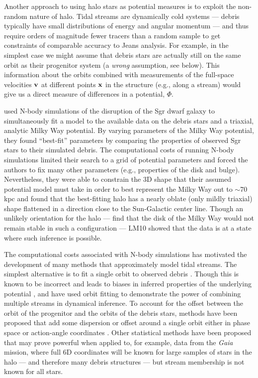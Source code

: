 \documentclass{emulateapj}
\newcommand{\project}[1]{\textsl{#1}}
\newcommand{\gaia}{\project{Gaia}}
\begin{document}
Another approach to using halo stars as potential measures is to exploit the non-random nature of halo. Tidal streams are dynamically cold systems --- debris typically have small distributions of energy and angular momentum --- and thus require orders of magnitude fewer tracers than a random sample to get constraints of comparable accuracy to Jeans analysis. For example, in the simplest case we might assume that debris stars are actually still on the same orbit as their progenitor system (a \emph{wrong} assumption, see below). This information about the orbits combined with measurements of the full-space velocities ${\bf v}$ at different points ${\bf x}$ in the structure (e.g., along a stream) would give us a direct measure of differences in a potential, $\Phi$.

\citet[][LM10]{law10} used N-body simulations of the disruption of the Sgr dwarf galaxy to simultaneously fit a model to the available data on the debris stars and a triaxial, analytic Milky Way potential. By varying parameters of the Milky Way potential, they found ``best-fit'' parameters by comparing the properties of observed Sgr stars to their simulated debris. The computational costs of running N-body simulations limited their search to a grid of potential parameters and forced the authors to fix many other parameters (e.g., properties of the disk and bulge). Nevertheless, they were able to constrain the 3D shape that their assumed potential model must take in order to best represent the Milky Way out to $\sim$70 kpc and found that the best-fitting halo has a nearly oblate (only mildly triaxial) shape flattened in a direction close to the Sun-Galactic center line. Though an unlikely orientation for the halo --- \cite{debattista13} find that the disk of the Milky Way would not remain stable in such a configuration --- LM10 showed that the data is at a state where such inference is possible. 

The computational costs associated with N-body simulations has motivated the development of many methods that approximately model tidal streams. The simplest alternative is to fit a single orbit to observed debris \citep[e.g.,][]{koposov10, deg13}. Though this is known to be incorrect and leads to biases in inferred properties of the underlying potential \citep[e.g.,][]{eyre11, lux13, sanders13a}, \cite{deg14} and \cite{lux13} have used orbit fitting to demonstrate the power of combining multiple streams in dynamical inference. To account for the offset between the orbit of the progenitor and the orbits of the debris stars, methods have been proposed that add some dispersion or offset around a single orbit either in phase space \citep[e.g.,][]{eyre09a, varghese11, kuepper12} or action-angle coordinates \citep{eyre11, sanders13b, bovy14, sanders14}. Other statistical methods have been proposed \citep[][]{johnston99a, penarrubia12, sanderson14} that may prove powerful when applied to, for example, data from the \gaia\, mission, where full 6D coordinates will be known for large samples of stars in the halo --- and therefore many debris structures --- but stream membership is not known for all stars.
\end{document}
